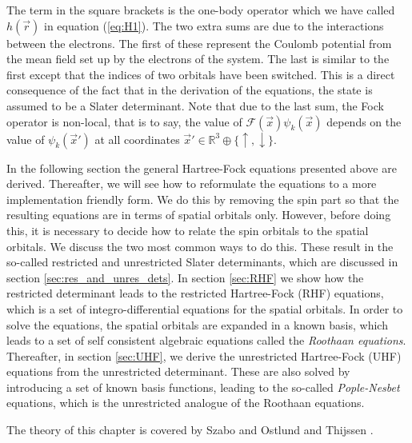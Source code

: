 The term in the square brackets is the one-body operator which we have called $h(\vec r)$ in equation (\ref{eq:H1}). The two extra sums are due to the interactions between
the electrons. The first of these represent the Coulomb potential from the mean field set up by the electrons of the system. The last is similar to the first
except that the indices of two orbitals have been switched. This is a direct consequence of the fact that in the derivation of the equations, the state
is assumed to be a Slater determinant. Note that due to the last sum, the Fock operator is non-local, that is to say, the value of $\mathcal{F}(\vec x)\psi_k(\vec x)$
depends on the value of $\psi_k(\vec x')$ at all coordinates $\vec x' \in \mathbb{R}^3 \oplus \{\uparrow, \downarrow\}$.

In the following section the general Hartree-Fock equations presented above are derived. Thereafter, we will see how to reformulate the equations to a more
implementation friendly form. We do this by removing the spin part so that the resulting equations are in terms of spatial orbitals only.
However, before doing this, it is necessary to decide how to relate the spin orbitals to the spatial orbitals. We discuss the two most common ways to
do this. These result in the so-called restricted and unrestricted Slater determinants, which are discussed in section \ref{sec:res_and_unres_dets}.
In section \ref{sec:RHF} we show how the restricted determinant leads to the restricted Hartree-Fock (RHF) equations, which is a set of integro-differential equations for
the spatial orbitals. In order to solve the equations, the spatial orbitals are expanded in a known basis, which leads to a set of self consistent algebraic equations
called the \emph{Roothaan equations}. Thereafter, in section \ref{sec:UHF}, we derive the unrestricted Hartree-Fock (UHF)
equations from the unrestricted determinant. These are also solved by introducing a set of known basis functions, leading to the so-called
\emph{Pople-Nesbet} equations, which is the unrestricted analogue of the Roothaan equations.

The theory of this chapter is covered by Szabo and Ostlund \cite{Szabo} and Thijssen \cite{Thijssen}.


